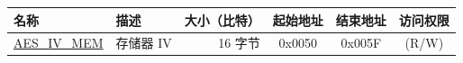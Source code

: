 \begin{longtable}{ |p{3cm} | p{3cm} | r | c | c | c |  }
\hline
\rowcolor{lightgray}
\textbf{名称} & \textbf{描述}  &  \textbf{大小（比特）}  &  \textbf{起始地址}  &  \textbf{结束地址}  & \textbf{访问权限}   \\ \hline
{\hyperref[memdesc:AESIVMEM]{AES\_IV\_MEM}} & 存储器 IV & 16 字节  & 0x0050 & 0x005F & (R/W) \\ \hline

\end{longtable}
